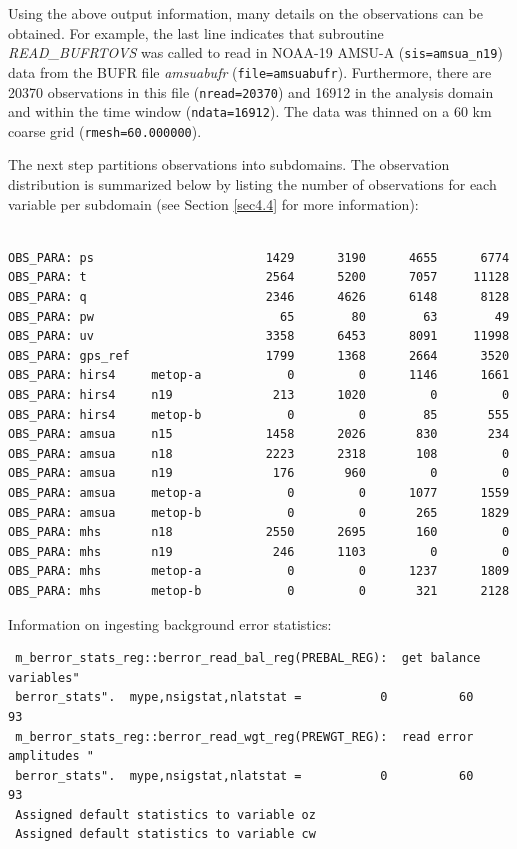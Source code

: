 Using the above output information, many details on the observations can be obtained. For example, the last line indicates that subroutine \textit{READ\_BUFRTOVS} was called to read in NOAA-19 AMSU-A (\verb|sis=amsua_n19|) data from the BUFR file \textit{amsuabufr} (\verb|file=amsuabufr|). Furthermore, there are 20370 observations in this file (\verb|nread=20370|) and 16912 in the analysis domain and within the time window (\verb|ndata=16912|). The data was thinned on a 60 km coarse grid (\verb|rmesh=60.000000|).

The next step partitions observations into subdomains. The observation distribution is summarized below by listing the number of observations for each variable per subdomain (see Section \ref{sec4.4} for more information):

\begin{scriptsize}
\begin{verbatim}

OBS_PARA: ps                        1429      3190      4655      6774
OBS_PARA: t                         2564      5200      7057     11128
OBS_PARA: q                         2346      4626      6148      8128
OBS_PARA: pw                          65        80        63        49
OBS_PARA: uv                        3358      6453      8091     11998
OBS_PARA: gps_ref                   1799      1368      2664      3520
OBS_PARA: hirs4     metop-a            0         0      1146      1661
OBS_PARA: hirs4     n19              213      1020         0         0
OBS_PARA: hirs4     metop-b            0         0        85       555
OBS_PARA: amsua     n15             1458      2026       830       234
OBS_PARA: amsua     n18             2223      2318       108         0
OBS_PARA: amsua     n19              176       960         0         0
OBS_PARA: amsua     metop-a            0         0      1077      1559
OBS_PARA: amsua     metop-b            0         0       265      1829
OBS_PARA: mhs       n18             2550      2695       160         0
OBS_PARA: mhs       n19              246      1103         0         0
OBS_PARA: mhs       metop-a            0         0      1237      1809
OBS_PARA: mhs       metop-b            0         0       321      2128

\end{verbatim}
\end{scriptsize}
Information on ingesting background error statistics:
\begin{scriptsize}
\begin{verbatim}
 m_berror_stats_reg::berror_read_bal_reg(PREBAL_REG):  get balance variables"
 berror_stats".  mype,nsigstat,nlatstat =           0          60          93
 m_berror_stats_reg::berror_read_wgt_reg(PREWGT_REG):  read error amplitudes "
 berror_stats".  mype,nsigstat,nlatstat =           0          60          93
 Assigned default statistics to variable oz
 Assigned default statistics to variable cw
\end{verbatim}
\end{scriptsize}

